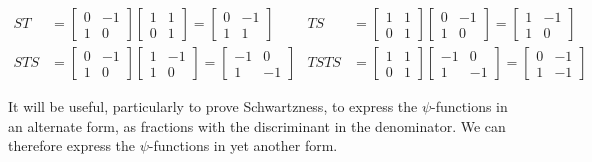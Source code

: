 \begin{align*}
    ST &= \begin{bmatrix}
        0 & -1 \\ 1 & 0
    \end{bmatrix}\begin{bmatrix}
        1 & 1 \\ 0 & 1
    \end{bmatrix} =  \begin{bmatrix}
        0 & -1 \\ 1 & 1
    \end{bmatrix} &
    TS &= \begin{bmatrix}
        1 & 1 \\ 0 & 1
    \end{bmatrix}\begin{bmatrix}
        0 & -1 \\ 1 & 0
    \end{bmatrix} = \begin{bmatrix}
        1 & -1 \\ 1 & 0
    \end{bmatrix} \\
    STS &= \begin{bmatrix}
        0 & -1 \\ 1 & 0
    \end{bmatrix}\begin{bmatrix}
        1 & -1 \\ 1 & 0
    \end{bmatrix} = \begin{bmatrix}
        -1 & 0 \\ 1 & -1
    \end{bmatrix} &
    TSTS &= \begin{bmatrix}
        1 & 1 \\ 0 & 1
    \end{bmatrix}\begin{bmatrix}
        -1 & 0 \\ 1 & -1
    \end{bmatrix} = \begin{bmatrix}
        0 & -1 \\ 1 & -1
    \end{bmatrix}
\end{align*}

It will be useful, particularly to prove Schwartzness, to express the $\psi$-functions in an alternate form, as fractions with the discriminant in the denominator. We can therefore express the $\psi$-functions in yet another form.

